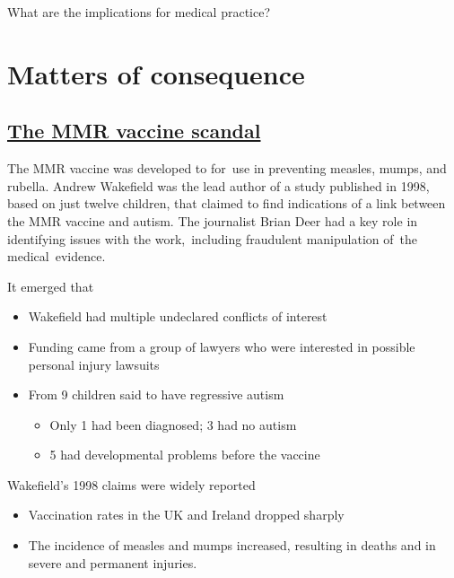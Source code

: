 \documentclass[
  10pt,
  b5paper]{book}
\providecommand{\tightlist}{%
  \setlength{\itemsep}{0pt}\setlength{\parskip}{0pt}}
\begin{document}
What are the implications for medical practice?

\hypertarget{matters-of-consequence}{%
\chapter{Matters of consequence}\label{matters-of-consequence}}

\hypertarget{the-mmr-vaccine-scandal}{%
\section{\texorpdfstring{\href{https://en.wikipedia.org/wiki/MMR_vaccine_controversy}{The MMR vaccine scandal}}{The MMR vaccine scandal}}\label{the-mmr-vaccine-scandal}}

The MMR vaccine was developed to for~use in preventing measles,
mumps, and rubella. Andrew Wakefield was the lead author of a
study published in 1998, based on just twelve children, that
claimed to find indications of a link between the MMR vaccine
and autism. The journalist Brian Deer had a key role in
identifying issues with the work,~including fraudulent
manipulation of~the medical~evidence.

It emerged that

\begin{itemize}
\tightlist
\item
  Wakefield had multiple undeclared conflicts of interest
\item
  Funding came from a group of lawyers who were interested
  in possible personal injury lawsuits
\item
  From 9 children said to have regressive autism

  \begin{itemize}
  \tightlist
  \item
    Only 1 had been diagnosed; 3 had no autism
  \item
    5 had developmental problems before the vaccine
  \end{itemize}
\end{itemize}

Wakefield's 1998 claims were widely reported

\begin{itemize}
\tightlist
\item
  Vaccination rates in the UK and Ireland dropped sharply
\item
  The incidence of measles and mumps increased, resulting
  in deaths and in severe and permanent injuries.
\end{itemize}
\end{document}
